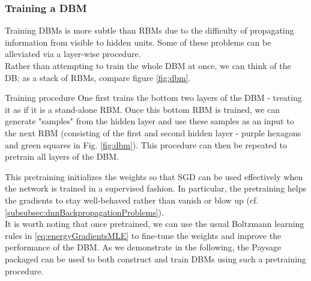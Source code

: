 \subsubsection{Training a DBM}
\label{subsubsec:deepGenerativeDBMTraining}
Training DBMs is more subtle than RBMs due to the difficulty of propagating information from visible to hidden units. Some of these problems can be alleviated via a layer-wise procedure.\\
Rather than attempting to train the whole DBM at once, we can think of the DB; as a stack of RBMs, compare figure \ref{fig:dbm}.
\begin{mybox}{Training procedure}
	One first trains the bottom two layers of the DBM - treating it as if it is a stand-alone RBM. Once this bottom RBM is trained, we can generate "samples" from the hidden layer and use these samples as an input to the next RBM (consisting of the first and second hidden layer - purple hexagons and green squares in Fig. \ref{fig:dbm}). This procedure can then be repeated to pretrain all layers of the DBM.
\end{mybox}
This pretraining initializes the weights so that SGD can be used effectively when the network is trained in a supervised fashion. In particular, the pretraining helps the gradients to stay well-behaved rather than vanish or blow up (cf. \ref{subsubsec:dnnBackpropagationProblems}).\\
It is worth noting that once pretrained, we can use the usual Boltzmann learning rules in \ref{eq:energyGradientsMLE} to fine-tune the weights and improve the performance of the DBM. As we demonstrate in the following, the Paysage packaged can be used to both construct and train DBMs using such a pretraining procedure.





